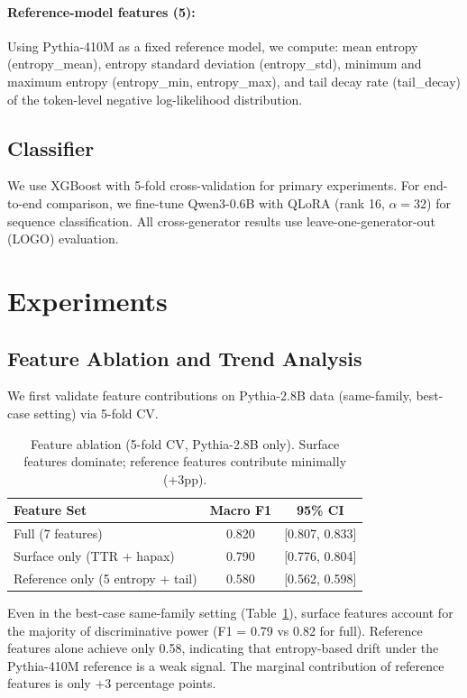 \documentclass[11pt,a4paper]{article}
\begin{document}
\paragraph{Reference-model features (5):} Using Pythia-410M as a fixed reference model, we compute: mean entropy (entropy\_mean), entropy standard deviation (entropy\_std), minimum and maximum entropy (entropy\_min, entropy\_max), and tail decay rate (tail\_decay) of the token-level negative log-likelihood distribution.

\subsection{Classifier}

We use XGBoost with 5-fold cross-validation for primary experiments.
For end-to-end comparison, we fine-tune Qwen3-0.6B with QLoRA (rank 16, $\alpha=32$) for sequence classification.
All cross-generator results use leave-one-generator-out (LOGO) evaluation.

\section{Experiments}

\subsection{Feature Ablation and Trend Analysis}
\label{sec:ablation}

We first validate feature contributions on Pythia-2.8B data (same-family, best-case setting) via 5-fold CV.

\begin{table}[h]
\centering
\caption{Feature ablation (5-fold CV, Pythia-2.8B only). Surface features dominate; reference features contribute minimally (+3pp).}
\label{tab:ablation}
\begin{tabular}{lcc}
\toprule
Feature Set & Macro F1 & 95\% CI \\
\midrule
Full (7 features) & 0.820 & [0.807, 0.833] \\
Surface only (TTR + hapax) & 0.790 & [0.776, 0.804] \\
Reference only (5 entropy + tail) & 0.580 & [0.562, 0.598] \\
\bottomrule
\end{tabular}
\end{table}

Even in the best-case same-family setting (Table~\ref{tab:ablation}), surface features account for the majority of discriminative power (F1 = 0.79 vs 0.82 for full).
Reference features alone achieve only 0.58, indicating that entropy-based drift under the Pythia-410M reference is a weak signal.
The marginal contribution of reference features is only +3 percentage points.
\end{document}
